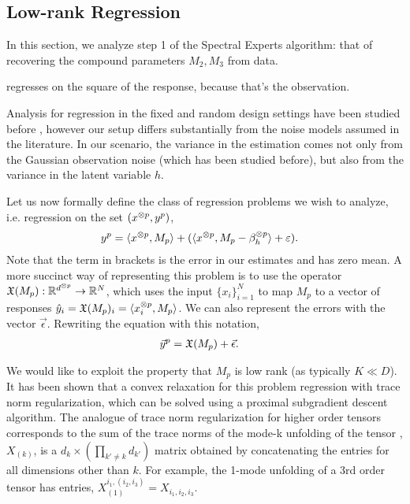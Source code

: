 \subsection{Low-rank Regression}
\label{sec:regression}

In this section, we analyze step 1 of the Spectral Experts
algorithm: that of recovering the compound parameters $M_2,M_3$
from data.


\cite{candesPhaseLift} regresses on the square of the response,
because that's the observation.

Analysis for regression in the fixed and random design settings have
been studied before \citep{HsuKakadeZhang}, however our setup differs
substantially from the noise models assumed in the literature. In our
scenario, the variance in the estimation comes not only from the
Gaussian observation noise (which has been studied before), but also
from the variance in the latent variable $h$.

Let us now formally define the class of regression problems we wish to
analyze, i.e. regression on the set $(x^{\otimes p}, y^p)$,
\begin{align*}
  y^p &= \langle x^{\otimes p}, M_p \rangle + (\langle x^{\otimes p}, M_p - \beta_h^{\otimes p} \rangle + \varepsilon).
\end{align*}
Note that the term in brackets is the error in our estimates and has
zero mean.  A more succinct way of representing this problem is to use
the operator $\operatorname{\mathfrak{X}}(M_p) : \mathbb{R}^{d^{\otimes p}} \to \mathbb{R}^{N}$, which uses the
input $\{ x_i \}_{i=1}^{N}$ to map $M_p$ to a vector of responses $\hat
y_i = \operatorname{\mathfrak{X}}(M_p)_i = \langle x_i^{\otimes p}, M_p \rangle$. We can also represent the
errors with the vector $\vec \epsilon$. Rewriting the equation with this notation, 
\begin{align*}
  \vec y^p &= \operatorname{\mathfrak{X}}(M_p) + \vec \epsilon.
\end{align*}

 We would like to exploit
the property that $M_p$ is low rank (as typically $K \ll D$). It has
been shown that a convex relaxation for this problem regression with
trace norm regularization, which can be solved using a proximal
subgradient descent algorithm\citationneeded. The analogue of trace norm
regularization for higher order tensors corresponds to the sum of the
trace norms of the mode-k unfolding of the tensor \cite{Tomioka2011},
$X_{(k)}$, is a $d_k \times (\prod_{k' \neq k} d_{k'})$ matrix obtained
by concatenating the entries for all dimensions other than $k$. For
example, the 1-mode unfolding of a 3rd order tensor has entries,
$X_{(1)}^{i_1, (i_2, i_3)} = X_{i_1, i_2, i_3}$.


